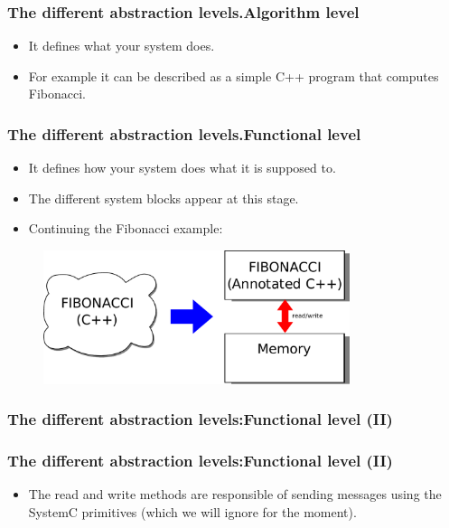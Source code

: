 {\begin{frame}
	\frametitle{The different abstraction levels.\newline Algorithm level}
	\begin{itemize}
		\item<1-> It defines what your system does.
		\item<1-> For example it can be described as a simple C++ program that computes Fibonacci.
	\end{itemize}
	\begin{figure}[h]
		
	\end{figure}
\end{frame}

\begin{frame}
	\frametitle{The different abstraction levels.\newline Functional level}
	\begin{itemize}
		\item<1-> It defines how your system does what it is supposed to.
		\item<1-> The different system blocks appear at this stage.
		\item<1-> Continuing the Fibonacci example:
	\end{itemize}
	\begin{figure}[h]
		\includegraphics[width=0.8\textwidth]{introduction/figures/fibonacci_algo_to_functional_level.pdf}
	\end{figure}
\end{frame}

\begin{frame}
	\frametitle{The different abstraction levels:\newline Functional level (II)}
	\begin{figure}[h]
		
	\end{figure}
\end{frame}

\begin{frame}
	\frametitle{The different abstraction levels:\newline Functional level (II)}
	\begin{itemize}
		\item<1-> The {\color{red}read} and {\color{red}write} methods are responsible of sending messages using the SystemC primitives (which we will ignore for the moment).
	\end{itemize}
	\begin{figure}[h]
		
	\end{figure}
\end{frame}

}
